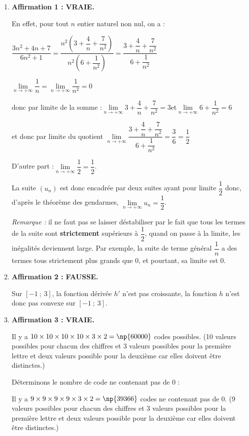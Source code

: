 \begin{enumerate}
	\item \textbf{Affirmation 1 : VRAIE.}

	En effet, pour tout $n$ entier naturel non nul, on a :

	$\dfrac{3n^2+4n+7}{6n^2+1}= \dfrac{n^2 \left(3+\dfrac{4}{n}+\dfrac{7}{n^2}\right)}{n^2 \left(6+\dfrac{1}{n^2}\right)}= \dfrac{3+\dfrac{4}{n}+\dfrac{7}{n^2}}{6+\dfrac{1}{n^2}}$

	$\lim\limits_{n\to +\infty} \dfrac{1}{n}=\lim\limits_{n\to +\infty} \dfrac{1}{n^2}=0$

	donc par limite de la somme :\quad $\lim\limits_{n \to +\infty} 3+\dfrac{4}{n}+\dfrac{7}{n^2}=3$\quad et\quad $\lim\limits_{n \to +\infty} 6+\dfrac{1}{n^2}=6$

	et donc par limite du quotient \quad$\lim\limits_{n\to +\infty } \dfrac{3+\dfrac{4}{n}+\dfrac{7}{n^2}}{6+\dfrac{1}{n^2}} = \dfrac{3}{6}=\dfrac{1}{2}$

	D'autre part :\quad $\lim\limits_{n\to +\infty} \dfrac{1}{2}=\dfrac{1}{2}$.

	La suite $\left(u_n\right)$ est donc encadrée par deux suites ayant pour limite $\dfrac{1}{2}$ donc, d'après le théorème des gendarmes, $\lim\limits_{n\to +\infty} u_n=\dfrac{1}{2}$.

	\emph{Remarque :} il ne faut pas se laisser déstabiliser par le fait que tous les termes de la suite sont \textbf{strictement} supérieurs à $\dfrac{1}{2}$, quand on \og passe à la limite\fg{}, les inégalités deviennent large. Par exemple, la suite de terme général $\dfrac{1}{n}$ a des termes tous strictement plus grands que 0, et pourtant, sa limite est 0.


	\item  \textbf{Affirmation 2 : FAUSSE.}

Sur $[-1~;~3]$, la fonction dérivée $h'$ n'est pas croissante, la fonction $h$ n'est donc pas convexe sur $[-1~;~3]$.

	\item \textbf{Affirmation 3 : VRAIE.}

Il y a $10 \times 10 \times 10 \times 10 \times 3 \times 2 = \np{60000}$ codes possibles.  (10 valeurs possibles pour chacun des chiffres et 3 valeurs possibles pour la première lettre et deux valeurs possible pour la deuxième car elles doivent être distinctes.)

Déterminons le nombre de code ne contenant pas de 0 :

Il y a $9\times 9 \times 9 \times 9 \times 3 \times 2 = \np{39366}$ codes ne contenant pas de 0. (9 valeurs possibles pour chacun des chiffres et 3 valeurs possibles pour la première lettre et deux valeurs possible pour la deuxième car elles doivent être distinctes.)


\end{enumerate}

